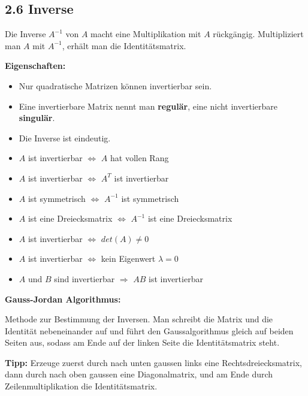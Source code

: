 \subsection{2.6 Inverse}{

Die Inverse $A^{-1}$ von $A$ macht eine Multiplikation mit $A$ rückgängig. Multipliziert man $A$ mit $A^{-1}$, erhält man die Identitätsmatrix.

\vspace{0pt}

\begin{center}
\end{center}

\textbf{Eigenschaften:}

 \vspace{-3pt}

\begin{itemize}[leftmargin=0.29cm, itemsep=0pt]
\item Nur quadratische Matrizen können invertierbar sein.
\item Eine invertierbare Matrix nennt man \textbf{regulär}, eine nicht invertierbare \textbf{singulär}.
\item Die Inverse ist eindeutig.
\item $A$ ist invertierbar $\Longleftrightarrow$ $A$ hat vollen Rang
\item $A$ ist invertierbar $\Longleftrightarrow$ $A^T$ ist invertierbar
\item $A$ ist symmetrisch $\Longleftrightarrow$ $A^{-1}$ ist symmetrisch
\item $A$ ist eine Dreiecksmatrix $\Longleftrightarrow$ $A^{-1}$ ist eine Dreiecksmatrix
\item $A$ ist invertierbar $\Longleftrightarrow$ $det(A) \neq 0$
\item $A$ ist invertierbar $\Longleftrightarrow$ kein Eigenwert $\lambda = 0$
\item $A$ und $B$ sind invertierbar $\Longrightarrow$ $AB$ ist invertierbar
\end{itemize}

\vskip0mm

\textbf{Gauss-Jordan Algorithmus:}\par
\vspace{1mm}
Methode zur Bestimmung der Inversen. Man schreibt die Matrix und die Identität nebeneinander auf und führt den Gaussalgorithmus gleich auf beiden Seiten aus, sodass am Ende auf der linken Seite die Identitätsmatrix steht. \par
\textbf{Tipp:} Erzeuge zuerst durch \glqq nach unten gaussen\grqq \hskip2pt links eine Rechtsdreiecksmatrix, dann durch \glqq nach oben gaussen\grqq  \hskip2pt eine Diagonalmatrix, und am Ende durch Zeilenmultiplikation die Identitätsmatrix.

}
